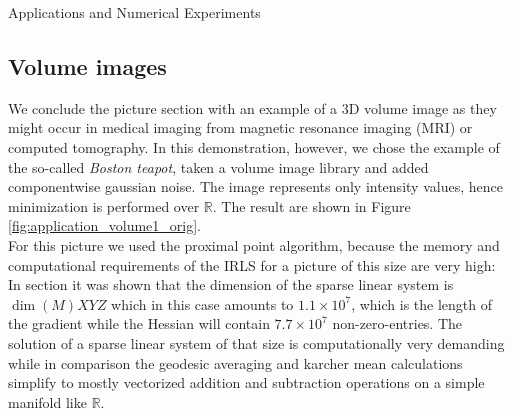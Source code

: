 \begin{chapter}{Applications and Numerical Experiments}
\subsection{Volume images} %
\label{sub:Volume images}
We conclude the picture section with an example of a 3D volume image as they might occur in medical imaging from magnetic resonance imaging (MRI) or
computed tomography. In this demonstration, however, we chose the example of the so-called \emph{Boston teapot}, taken a volume image library \cite{volumeLib}
and added componentwise gaussian noise. The image represents only intensity values, hence minimization is performed over $\mathbb{R}$. The result are shown
in Figure \ref{fig:application_volume1_orig}.\\

For this picture we used the proximal point algorithm, because the memory and computational requirements of the IRLS for a picture of this size are very high:
In section \label{sub:NewtonequationfortheTVfunctional} it was shown that the dimension of the sparse linear system is $\operatorname{dim}(M)XYZ$ which
in this case amounts to $1.1\times 10^{7}$, which is the length of the gradient while the Hessian will contain $7.7\times 10^{7}$ non-zero-entries.
The solution of a sparse linear system of that size is computationally very demanding while in comparison the geodesic averaging and karcher mean calculations
simplify to mostly vectorized addition and subtraction operations on a simple manifold like $\mathbb{R}$.


\end{chapter}
